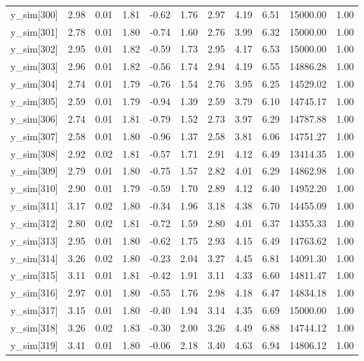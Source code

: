 \begin{table}[ht]
\begin{tabular}{rrrrrrrrrrr}
  y\_sim[300] & 2.98 & 0.01 & 1.81 & -0.62 & 1.76 & 2.97 & 4.19 & 6.51 & 15000.00 & 1.00 \\ 
  y\_sim[301] & 2.78 & 0.01 & 1.80 & -0.74 & 1.60 & 2.76 & 3.99 & 6.32 & 15000.00 & 1.00 \\ 
  y\_sim[302] & 2.95 & 0.01 & 1.82 & -0.59 & 1.73 & 2.95 & 4.17 & 6.53 & 15000.00 & 1.00 \\ 
  y\_sim[303] & 2.96 & 0.01 & 1.82 & -0.56 & 1.74 & 2.94 & 4.19 & 6.55 & 14886.28 & 1.00 \\ 
  y\_sim[304] & 2.74 & 0.01 & 1.79 & -0.76 & 1.54 & 2.76 & 3.95 & 6.25 & 14529.02 & 1.00 \\ 
  y\_sim[305] & 2.59 & 0.01 & 1.79 & -0.94 & 1.39 & 2.59 & 3.79 & 6.10 & 14745.17 & 1.00 \\ 
  y\_sim[306] & 2.74 & 0.01 & 1.81 & -0.79 & 1.52 & 2.73 & 3.97 & 6.29 & 14787.88 & 1.00 \\ 
  y\_sim[307] & 2.58 & 0.01 & 1.80 & -0.96 & 1.37 & 2.58 & 3.81 & 6.06 & 14751.27 & 1.00 \\ 
  y\_sim[308] & 2.92 & 0.02 & 1.81 & -0.57 & 1.71 & 2.91 & 4.12 & 6.49 & 13414.35 & 1.00 \\ 
  y\_sim[309] & 2.79 & 0.01 & 1.80 & -0.75 & 1.57 & 2.82 & 4.01 & 6.29 & 14862.98 & 1.00 \\ 
  y\_sim[310] & 2.90 & 0.01 & 1.79 & -0.59 & 1.70 & 2.89 & 4.12 & 6.40 & 14952.20 & 1.00 \\ 
  y\_sim[311] & 3.17 & 0.02 & 1.80 & -0.34 & 1.96 & 3.18 & 4.38 & 6.70 & 14455.09 & 1.00 \\ 
  y\_sim[312] & 2.80 & 0.02 & 1.81 & -0.72 & 1.59 & 2.80 & 4.01 & 6.37 & 14355.33 & 1.00 \\ 
  y\_sim[313] & 2.95 & 0.01 & 1.80 & -0.62 & 1.75 & 2.93 & 4.15 & 6.49 & 14763.62 & 1.00 \\ 
  y\_sim[314] & 3.26 & 0.02 & 1.80 & -0.23 & 2.04 & 3.27 & 4.45 & 6.81 & 14091.30 & 1.00 \\ 
  y\_sim[315] & 3.11 & 0.01 & 1.81 & -0.42 & 1.91 & 3.11 & 4.33 & 6.60 & 14811.47 & 1.00 \\ 
  y\_sim[316] & 2.97 & 0.01 & 1.80 & -0.55 & 1.76 & 2.98 & 4.18 & 6.47 & 14834.18 & 1.00 \\ 
  y\_sim[317] & 3.15 & 0.01 & 1.80 & -0.40 & 1.94 & 3.14 & 4.35 & 6.69 & 15000.00 & 1.00 \\ 
  y\_sim[318] & 3.26 & 0.02 & 1.83 & -0.30 & 2.00 & 3.26 & 4.49 & 6.88 & 14744.12 & 1.00 \\ 
  y\_sim[319] & 3.41 & 0.01 & 1.80 & -0.06 & 2.18 & 3.40 & 4.63 & 6.94 & 14806.12 & 1.00 \\ 

\end{tabular}
\end{table}
